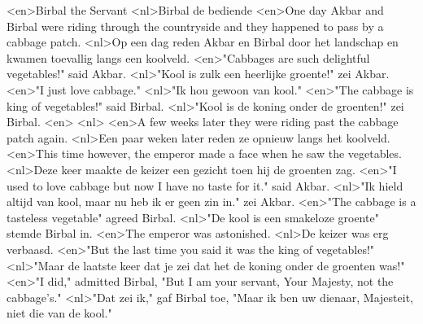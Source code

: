 <en>Birbal the Servant
<nl>Birbal de bediende
<en>One day Akbar and Birbal were riding through the countryside and they happened to pass by a cabbage patch.
<nl>Op een dag reden Akbar en Birbal door het landschap en kwamen toevallig langs een koolveld.
<en>"Cabbages are such delightful vegetables!" said Akbar.
<nl>"Kool is zulk een heerlijke groente!" zei Akbar.
<en>"I just love cabbage."
<nl>"Ik hou gewoon van kool."
<en>"The cabbage is king of vegetables!" said Birbal.
<nl>"Kool is de koning onder de groenten!" zei Birbal.
<en>
<nl>
<en>A few weeks later they were riding past the cabbage patch again.
<nl>Een paar weken later reden ze opnieuw langs het koolveld.
<en>This time however, the emperor made a face when he saw the vegetables.
<nl>Deze keer maakte de keizer een gezicht toen hij de groenten zag.
<en>"I used to love cabbage but now I have no taste for it." said Akbar.
<nl>"Ik hield altijd van kool, maar nu heb ik er geen zin in." zei Akbar.
<en>"The cabbage is a tasteless vegetable" agreed Birbal.
<nl>"De kool is een smakeloze groente" stemde Birbal in.
<en>The emperor was astonished.
<nl>De keizer was erg verbaasd.
<en>"But the last time you said it was the king of vegetables!"
<nl>"Maar de laatste keer dat je zei dat het de koning onder de groenten was!"
<en>"I did," admitted Birbal, "But I am your servant, Your Majesty, not the cabbage's."
<nl>"Dat zei ik," gaf Birbal toe, "Maar ik ben uw dienaar, Majesteit, niet die van de kool."
